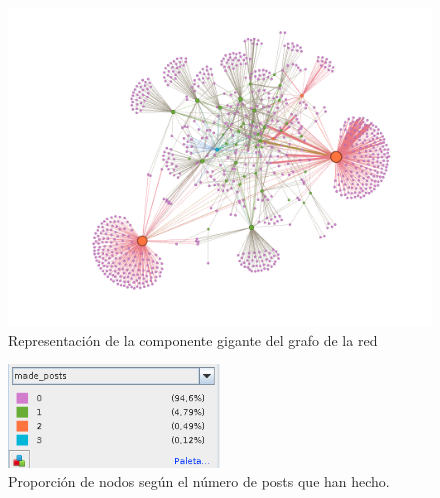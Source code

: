 \documentclass[10pt,a4paper,spanish]{article}
\numberwithin{equation}{section} %
\numberwithin{figure}{section} %
\numberwithin{table}{section} %
\begin{document}
\begin{figure}[!h]
    \centering
    \includegraphics[width=\textwidth]{2}
    \caption{Representación de la componente gigante del grafo de la red}
    \label{conexa}
\end{figure}

\begin{figure}[!h]
    \centering
    \includegraphics[width=0.5\textwidth]{3}
    \caption{Proporción de nodos según el número de posts que han hecho.}
    \label{proporcion}
\end{figure}


\end{document}
